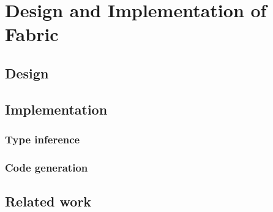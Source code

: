 \chapter{Design and Implementation of Fabric}
\label{fabric}

\section{Design}

\section{Implementation}

\subsection{Type inference}

\subsection{Code generation}

\section{Related work}
